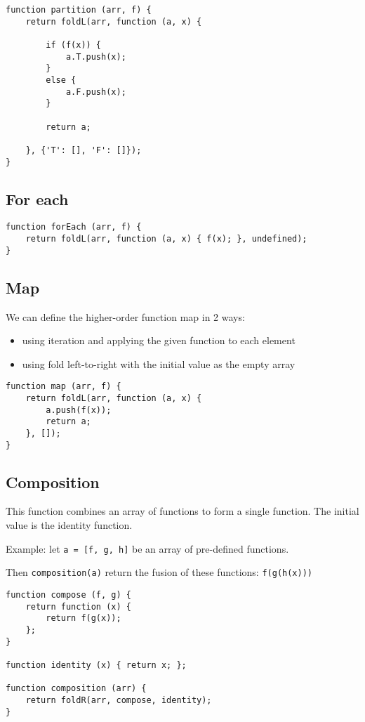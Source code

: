 \documentclass[12pt]{article}
\begin{document}
\medskip
\begin{lstlisting}
function partition (arr, f) {
	return foldL(arr, function (a, x) {

		if (f(x)) {
			a.T.push(x);
		}
		else {
			a.F.push(x);
		}
		
		return a;

	}, {'T': [], 'F': []});
}
\end{lstlisting}

\subsection*{For each}
\medskip
\begin{lstlisting}
function forEach (arr, f) {
	return foldL(arr, function (a, x) { f(x); }, undefined);
}
\end{lstlisting}

\subsection*{Map}
We can define the higher-order function map in 2 ways:
\begin{itemize}
	\item using iteration and applying the given function to each element
	\item using fold left-to-right with the initial value as the empty array
\end{itemize}

\medskip
\begin{lstlisting}
function map (arr, f) {
	return foldL(arr, function (a, x) {
		a.push(f(x));
		return a;
	}, []);
}
\end{lstlisting}

\subsection*{Composition}
This function combines an array of functions to form a single function. The initial value is the
identity function.

Example: let \verb|a = [f, g, h]| be an array of pre-defined functions.

Then \verb|composition(a)| return the fusion of these functions: \verb|f(g(h(x)))|

\medskip
\begin{lstlisting}
function compose (f, g) {
	return function (x) {
		return f(g(x));
	};
}

function identity (x) { return x; };

function composition (arr) {
	return foldR(arr, compose, identity);
}
\end{lstlisting}
\end{document}
